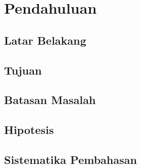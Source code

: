 \chapter{Pendahuluan}

\section{Latar Belakang}
\blindtext

\section{Tujuan}
\blindtext

\section{Batasan Masalah}
\blindtext

\section{Hipotesis}
\blindtext

\section{Sistematika Pembahasan}
\blindtext
